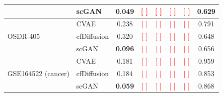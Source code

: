 \documentclass[11pt]{article}
\newcommand{\res}[1]{\textcolor{red}{[#1]}}
\begin{document}
\begin{table}[t]
{\begin{tabular}{@{}l l c c c c c c@{}}
 & scGAN       & \textbf{0.049} & \res{ } & \res{ } & \res{ } & \res{ } & 0.629 \\
\midrule
\multirow{3}{*}{OSDR-405}
 & CVAE        & 0.238 & \res{ } & \res{ } & \res{ } & \res{ } & 0.791 \\
 & cfDiffusion & 0.320 & \res{ } & \res{ } & \res{ } & \res{ } & 0.648 \\
 & scGAN       & \textbf{0.096} & \res{ } & \res{ } & \res{ } & \res{ } & 0.656 \\
\midrule
\multirow{3}{*}{GSE164522 (cancer)}
 & CVAE        & 0.181 & \res{ } & \res{ } & \res{ } & \res{ } & 0.959 \\
 & cfDiffusion & 0.184 & \res{ } & \res{ } & \res{ } & \res{ } & 0.853 \\
 & scGAN       & \textbf{0.059} & \res{ } & \res{ } & \res{ } & \res{ } & 0.868 \\
\bottomrule
\end{tabular}}
\end{table}
\end{document}
